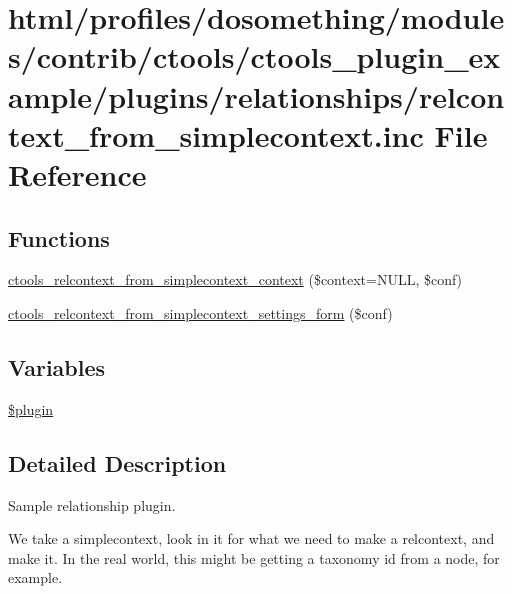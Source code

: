 \hypertarget{relcontext__from__simplecontext_8inc}{
\section{html/profiles/dosomething/modules/contrib/ctools/ctools\_\-plugin\_\-example/plugins/relationships/relcontext\_\-from\_\-simplecontext.inc File Reference}
\label{relcontext__from__simplecontext_8inc}
}
\subsection*{Functions}
\begin{DoxyCompactItemize}
\item 
\hyperlink{relcontext__from__simplecontext_8inc_abed4b100c64dc8ffb3867ae551e0ae88}{ctools\_\-relcontext\_\-from\_\-simplecontext\_\-context} (\$context=NULL, \$conf)
\item 
\hyperlink{relcontext__from__simplecontext_8inc_a6941982dec73fea7cd33fc91523b1f25}{ctools\_\-relcontext\_\-from\_\-simplecontext\_\-settings\_\-form} (\$conf)
\end{DoxyCompactItemize}
\subsection*{Variables}
\begin{DoxyCompactItemize}
\item 
\hyperlink{relcontext__from__simplecontext_8inc_ada8a7130088351710bb02ed622d6bf65}{\$plugin}
\end{DoxyCompactItemize}


\subsection{Detailed Description}
Sample relationship plugin.

We take a simplecontext, look in it for what we need to make a relcontext, and make it. In the real world, this might be getting a taxonomy id from a node, for example. 

